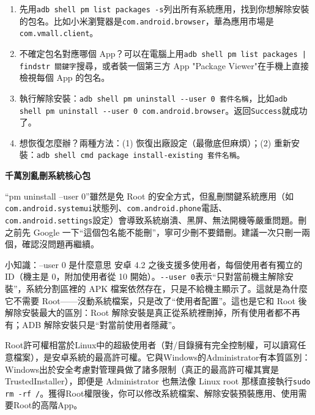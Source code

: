 \begin{enumerate}
  \item 先用\texttt{adb shell pm list packages -\allowbreak s}列出所有系統應用，找到你想解除安裝的包名。比如小米瀏覽器是\texttt{com.\allowbreak android.\allowbreak browser}，華為應用市場是\texttt{com.\allowbreak vmall.\allowbreak client}。
  \item 不確定包名對應哪個 App？可以在電腦上用\texttt{adb shell pm list packages | findstr 關鍵字}搜尋，或者裝一個第三方 App "Package Viewer"在手機上直接檢視每個 App 的包名。
  \item 執行解除安裝：\texttt{adb shell pm uninstall -\allowbreak -\allowbreak user 0 套件名稱}，比如\texttt{adb shell pm uninstall -\allowbreak -\allowbreak user 0 com.\allowbreak android.\allowbreak browser}。返回\texttt{Success}就成功了。
  \item 想恢復怎麼辦？兩種方法：(1) 恢復出廠設定（最徹底但麻煩）；(2) 重新安裝：\texttt{adb shell cmd package install-\allowbreak existing 套件名稱}。
\end{enumerate}

\textbf{千萬別亂刪系統核心包}\par

“pm uninstall --user 0”雖然是免 Root 的安全方式，但亂刪關鍵系統應用（如\texttt{com.\allowbreak android.\allowbreak systemui}狀態列、\texttt{com.\allowbreak android.\allowbreak phone}電話、\texttt{com.\allowbreak android.\allowbreak settings}設定）會導致系統崩潰、黑屏、無法開機等嚴重問題。刪之前先 Google 一下“這個包名能不能刪”，寧可少刪不要錯刪。建議一次只刪一兩個，確認沒問題再繼續。

\begin{tcbinfo}{小知識：--user 0 是什麼意思}
安卓 4.2 之後支援多使用者，每個使用者有獨立的 ID（機主是 0，附加使用者從 10 開始）。\texttt{-\allowbreak -\allowbreak user 0}表示“只對當前機主解除安裝”，系統分割區裡的 APK 檔案依然存在，只是不給機主顯示了。這就是為什麼它不需要 Root——沒動系統檔案，只是改了“使用者配置”。這也是它和 Root 後解除安裝最大的區別：Root 解除安裝是真正從系統裡刪掉，所有使用者都不再有；ADB 解除安裝只是“對當前使用者隱藏”。

\end{tcbinfo}


Root許可權相當於Linux中的超級使用者（對/目錄擁有完全控制權，可以讀寫任意檔案），是安卓系統的最高許可權。它與Windows的Administrator有本質區別：Windows出於安全考慮對管理員做了諸多限制（真正的最高許可權其實是 TrustedInstaller），即便是 Administrator 也無法像 Linux root 那樣直接執行\texttt{sudo rm -\allowbreak rf /\allowbreak *}。獲得Root權限後，你可以修改系統檔案、解除安裝預裝應用、使用需要Root的高階App。

